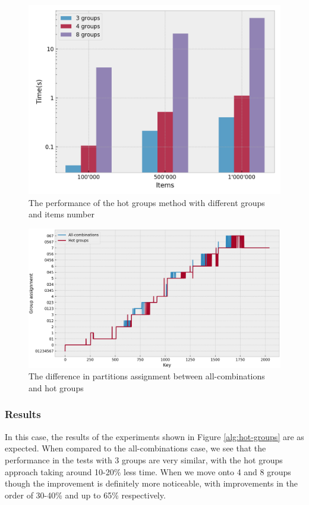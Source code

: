 \begin{figure}[!htb]
  \centering
  \includegraphics[width=\textwidth,height=\textheight,keepaspectratio]{img/hot.png}
  \caption{The performance of the hot groups method with different groups and items number}
  \label{fig:hot}
\end{figure}

\begin{figure}[!htb]
  \centering
  \includegraphics[width=\textwidth,height=\textheight,keepaspectratio]{img/partition_difference_hot_all.png}
  \caption{The difference in partitions assignment between all-combinations and hot groups}
  \label{fig:hot-partitioning}
\end{figure}

\subsubsection{Results}
In this case, the results of the experiments shown in Figure \ref{alg:hot-groups} are as expected. When compared to the all-combinations case, we see that the performance in the tests with 3 groups are very similar, with the hot groups approach taking around 10-20\% less time. When we move onto 4 and 8 groups though the improvement is definitely more noticeable, with improvements in the order of 30-40\% and up to 65\% respectively.

